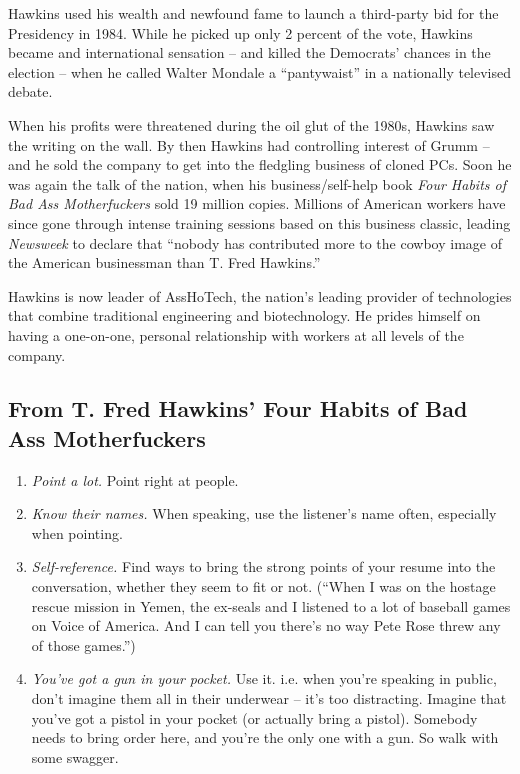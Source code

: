 \documentclass[a4paper,10pt]{article}
\begin{document}
Hawkins used his wealth and newfound fame to launch a third-party bid for the Presidency in 1984. While he picked up only 2 percent of the vote, Hawkins became and international sensation -- and killed the Democrats' chances in the election -- when he called Walter Mondale a ``pantywaist'' in a nationally televised debate.

When his profits were threatened during the oil glut of the 1980s, Hawkins saw the writing on the wall. By then Hawkins had controlling interest of Grumm -- and he sold the company to get into the fledgling business of cloned PCs. Soon he was again the talk of the nation, when his business/self-help book \textit{Four Habits of Bad Ass Motherfuckers} sold 19 million copies. Millions of American workers have since gone through intense training sessions based on this business classic, leading \textit{Newsweek} to declare that ``nobody has contributed more to the cowboy image of the American businessman than T. Fred Hawkins.''

Hawkins is now leader of AssHoTech, the nation's leading provider of technologies that combine traditional engineering and biotechnology. He prides himself on having a one-on-one, personal relationship with workers at all levels of the company.

\pagebreak

\subsection*{From T. Fred Hawkins' Four Habits of Bad Ass Motherfuckers}
\label{sec:4Habits}

\begin{enumerate}
 \item \textit{Point a lot.} Point right at people.
 \item \textit{Know their names.} When speaking, use the listener's name often, especially when pointing.
 \item \textit{Self-reference.} Find ways to bring the strong points of your resume into the conversation, whether they seem to fit or not. (``When I was on the hostage rescue mission in Yemen, the ex-seals and I listened to a lot of baseball games on Voice of America. And I can tell you there's no way Pete Rose threw any of those games.'')
 \item \textit{You've got a gun in your pocket.} Use it. i.e. when you're speaking in public, don't imagine them all in their underwear -- it's too distracting. Imagine that you've got a pistol in your pocket (or actually bring a pistol). Somebody needs to bring order here, and you're the only one with a gun. So walk with some swagger.
\end{enumerate}
\end{document}
